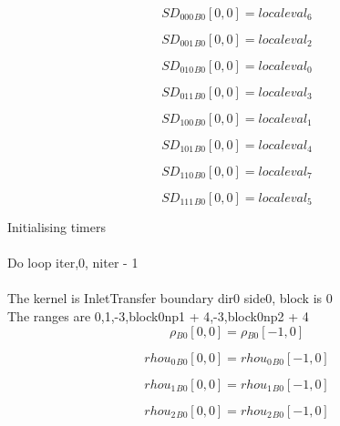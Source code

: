 \documentclass{article}
\begin{document}
\begin{dmath}{SD_{000}{_{B0}}}[{0,0}] = localeval_{6}\end{dmath}

\begin{dmath}{SD_{001}{_{B0}}}[{0,0}] = localeval_{2}\end{dmath}

\begin{dmath}{SD_{010}{_{B0}}}[{0,0}] = localeval_{0}\end{dmath}

\begin{dmath}{SD_{011}{_{B0}}}[{0,0}] = localeval_{3}\end{dmath}

\begin{dmath}{SD_{100}{_{B0}}}[{0,0}] = localeval_{1}\end{dmath}

\begin{dmath}{SD_{101}{_{B0}}}[{0,0}] = localeval_{4}\end{dmath}

\begin{dmath}{SD_{110}{_{B0}}}[{0,0}] = localeval_{7}\end{dmath}

\begin{dmath}{SD_{111}{_{B0}}}[{0,0}] = localeval_{5}\end{dmath}

\noindent Initialising timers\\
\\\noindent Do loop iter,0, niter - 1\\
\\\noindent The kernel is InletTransfer boundary dir0 side0, block is 0\\\noindent The ranges are 0,1,-3,block0np1 + 4,-3,block0np2 + 4\\\begin{dmath}{\rho{_{B0}}}[{0,0}] = {\rho{_{B0}}}[{-1,0}]\end{dmath}

\begin{dmath}{rhou_{0}{_{B0}}}[{0,0}] = {rhou_{0}{_{B0}}}[{-1,0}]\end{dmath}

\begin{dmath}{rhou_{1}{_{B0}}}[{0,0}] = {rhou_{1}{_{B0}}}[{-1,0}]\end{dmath}

\begin{dmath}{rhou_{2}{_{B0}}}[{0,0}] = {rhou_{2}{_{B0}}}[{-1,0}]\end{dmath}
\end{document}
